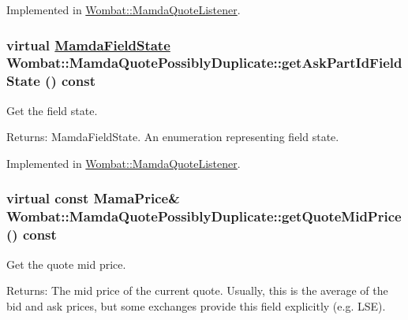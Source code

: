 Implemented in \hyperlink{classWombat_1_1MamdaQuoteListener_b8a1c5463eb9ebf89fc402c32e2c81c7}{Wombat::Mamda\-Quote\-Listener}.\hypertarget{classWombat_1_1MamdaQuotePossiblyDuplicate_efe6c8366375ad3dda4eebc34b34f3eb}{
\subsubsection[getAskPartIdFieldState]{\setlength{\rightskip}{0pt plus 5cm}virtual \hyperlink{namespaceWombat_93aac974f2ab713554fd12a1fa3b7d2a}{Mamda\-Field\-State} Wombat::Mamda\-Quote\-Possibly\-Duplicate::get\-Ask\-Part\-Id\-Field\-State () const}}
\label{classWombat_1_1MamdaQuotePossiblyDuplicate_efe6c8366375ad3dda4eebc34b34f3eb}


Get the field state. 

\begin{Desc}
\item[Returns:]Mamda\-Field\-State. An enumeration representing field state. \end{Desc}


Implemented in \hyperlink{classWombat_1_1MamdaQuoteListener_9208a03480064d6bd80ed3b95136c752}{Wombat::Mamda\-Quote\-Listener}.\hypertarget{classWombat_1_1MamdaQuotePossiblyDuplicate_c2dab543a5727df2cba6b320c4be6400}{
\subsubsection[getQuoteMidPrice]{\setlength{\rightskip}{0pt plus 5cm}virtual const Mama\-Price\& Wombat::Mamda\-Quote\-Possibly\-Duplicate::get\-Quote\-Mid\-Price () const}}
\label{classWombat_1_1MamdaQuotePossiblyDuplicate_c2dab543a5727df2cba6b320c4be6400}


Get the quote mid price. 

\begin{Desc}
\item[Returns:]The mid price of the current quote. Usually, this is the average of the bid and ask prices, but some exchanges provide this field explicitly (e.g. LSE). \end{Desc}



